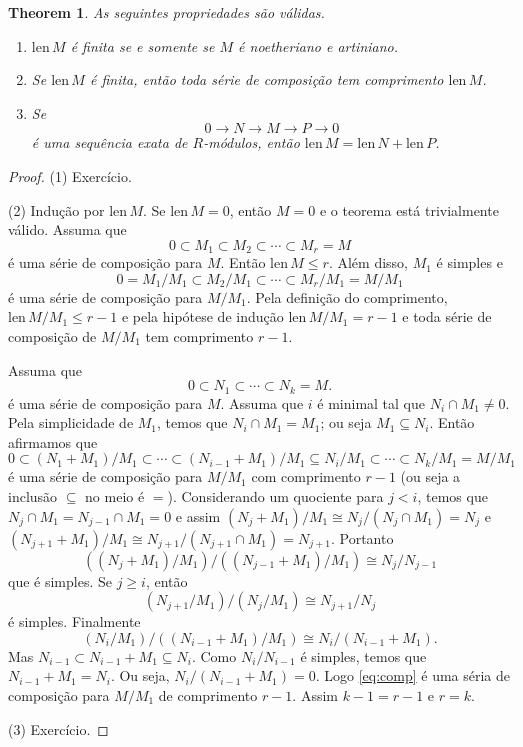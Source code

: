 \documentclass[12pt]{amsart}
\newcommand{\len}{\mbox{len}\,}
\newtheorem{theorem}{Theorem}
\theoremstyle{definition}
\begin{document}
\begin{theorem}
    As seguintes propriedades são válidas.
\begin{enumerate}
    \item $\len M$ é finita se e somente se $M$ é noetheriano e artiniano. 
    \item Se $\len M$ é finita, então toda série de composição tem  comprimento $\len M$.  
    \item Se
    \[
        0\to N\to M\to P\to 0
    \]
    é uma sequência exata de $R$-módulos, então $\len M=\len N+\len P$. 
\end{enumerate}
\end{theorem}
\begin{proof}
    (1) Exercício.

    (2) Indução por $\len M$. Se $\len M=0$, então $M=0$ e o teorema está trivialmente válido. 
    Assuma que 
    \[
        0\subset M_1\subset M_2\subset \cdots \subset M_r=M
    \]
    é uma série de composição para $M$. Então $\len M\leq r$. Além disso, $M_1$ é simples e 
    \[
0=M_1/M_1\subset M_2/M_1\subset\cdots \subset M_r/M_1=M/M_1
    \]
    é uma série de composição para $M/M_1$. Pela definição do comprimento, $\len M/M_1\leq r-1$ e 
    pela hipótese de indução $\len M/M_1=r-1$ e toda série de composição de $M/M_1$ tem comprimento 
    $r-1$. 

    Assuma que 
    \[
        0\subset N_1\subset\cdots\subset N_k=M.
    \]
    é uma série de composição para $M$. Assuma que $i$ é minimal tal que $N_i\cap M_1\neq 0$. Pela simplicidade 
    de $M_1$, temos que $N_i\cap M_1=M_1$; ou seja $M_1\subseteq N_i$. Então afirmamos que 
    \begin{equation}\label{eq:comp}
       0\subset (N_1+M_1)/M_1\subset\cdots\subset (N_{i-1}+M_1)/M_1\subseteq N_i/M_1 \subset\cdots
       \subset N_k/M_1=M/M_1
    \end{equation}
    é uma série de composição para $M/M_1$ com comprimento $r-1$ (ou seja a inclusão $\subseteq$ no meio é 
    $=$). Considerando um quociente para $j<i$, temos que 
    $N_j\cap M_1=N_{j-1}\cap M_1=0$ e assim $(N_j+M_1)/M_1\cong N_j/(N_j\cap M_1)=N_j$ e 
    $(N_{j+1}+M_1)/M_1\cong N_{j+1}/(N_{j+1}\cap M_1)=N_{j+1}$. Portanto
    \[%
        ((N_{j}+M_1)/M_1)/((N_{j-1}+M_1)/M_1)\cong
        N_j/N_{j-1}
    \]%
    que é simples. 
    Se $j\geq i$, então 
    \[
        (N_{j+1}/M_1)/(N_{j}/M_1)\cong N_{j+1}/N_{j}
    \]
    é simples. 
    Finalmente 
    \[
        (N_i/M_1)/((N_{i-1}+ M_1)/M_1)\cong N_i/(N_{i-1}+M_1).
    \]
    Mas $N_{i-1}\subset N_{i-1}+M_1\subseteq N_{i}$. Como $N_i/N_{i-1}$ é simples, temos que 
    $N_{i-1}+M_1= N_i$. Ou seja, $N_i/(N_{i-1}+ M_1)=0$. Logo \eqref{eq:comp} é uma séria de 
    composição para $M/M_1$ de comprimento $r-1$. Assim $k-1=r-1$ e $r=k$. 

    (3) Exercício.
\end{proof}
\end{document}
